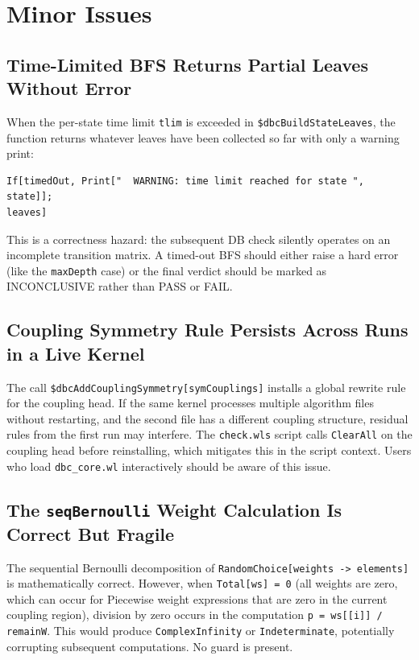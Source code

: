 \documentclass[12pt,a4paper]{article}
\theoremstyle{critical}
\theoremstyle{remark}
\begin{document}
\section{Minor Issues}
\label{sec:minor}

\subsection{Time-Limited BFS Returns Partial Leaves Without Error}

When the per-state time limit \texttt{tlim} is exceeded in
\texttt{\$dbcBuildStateLeaves}, the function returns whatever leaves have been collected
so far with only a warning print:
\begin{lstlisting}
If[timedOut, Print["  WARNING: time limit reached for state ", state]];
leaves]
\end{lstlisting}
This is a correctness hazard: the subsequent DB check silently operates on an incomplete
transition matrix. A timed-out BFS should either raise a hard error (like the
\texttt{maxDepth} case) or the final verdict should be marked as INCONCLUSIVE rather
than PASS or FAIL.

\subsection{Coupling Symmetry Rule Persists Across Runs in a Live Kernel}

The call \texttt{\$dbcAddCouplingSymmetry[symCouplings]} installs a global rewrite rule
for the coupling head. If the same kernel processes multiple algorithm files without
restarting, and the second file has a different coupling structure, residual rules from
the first run may interfere. The \texttt{check.wls} script calls \texttt{ClearAll} on
the coupling head before reinstalling, which mitigates this in the script context. Users
who load \texttt{dbc\_core.wl} interactively should be aware of this issue.

\subsection{The \texttt{seqBernoulli} Weight Calculation Is Correct But Fragile}

The sequential Bernoulli decomposition of \texttt{RandomChoice[weights -> elements]}
is mathematically correct. However, when \texttt{Total[ws] = 0} (all weights are zero,
which can occur for Piecewise weight expressions that are zero in the current coupling
region), division by zero occurs in the computation \texttt{p = ws[[i]] / remainW}.
This would produce \texttt{ComplexInfinity} or \texttt{Indeterminate}, potentially
corrupting subsequent computations. No guard is present.
\end{document}
